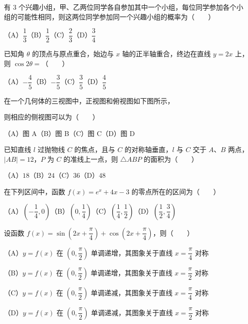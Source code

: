 \begin{question}
有 $3$ 个兴趣小组，甲、乙两位同学各自参加其中一个小组，每位同学参加各个小组的可能性相同，则这两位同学参加同一个兴趣小组的概率为\mbox{（　　）}

（A）$\dfrac13$\quad（B）$\dfrac12$\quad（C）$\dfrac23$\quad（D）$\dfrac34$

\end{question}
\begin{question}
已知角 $\theta$ 的顶点与原点重合，始边与 $x$ 轴的正半轴重合，终边在直线 $y=2x$ 上，则 $\cos2\theta=$\mbox{（　　）}

（A）$-\dfrac45$\quad（B）$-\dfrac35$\quad（C）$\dfrac35$\quad（D）$\dfrac45$

\Needspace{0.4\textheight}
\end{question}
\begin{question}
在一个几何体的三视图中，正视图和俯视图如下图所示，

则相应的侧视图可以为\mbox{（　　）}
\nopagebreak[4]
\begin{center}\end{center}
\nopagebreak[4]
（A）图 A\quad（B）图 B\quad（C）图 C\quad（D）图 D

\end{question}
\begin{question}
已知直线 $l$ 过抛物线 $C$ 的焦点，且与 $C$ 的对称轴垂直，$l$ 与 $C$ 交于 $A\text{、}B$ 两点，$|AB|=12$，$P$ 为 $C$ 的准线上一点，则 $\triangle ABP$ 的面积为\mbox{（　　）}

（A）$18$\quad（B）$24$\quad（C）$36$\quad（D）$48$

\end{question}
\begin{question}
在下列区间中，函数 $f(x)=e^x+4x-3$ 的零点所在的区间为\mbox{（　　）}

（A）$\left(-\dfrac14,0\right)$\quad（B）$\left(0,\dfrac14\right)$\quad（C）$\left(\dfrac14,\dfrac12\right)$\quad（D）$\left(\dfrac12,\dfrac34\right)$

\end{question}
\begin{question}
设函数 $f(x)=\sin\left(2x+\dfrac\pi4\right)+\cos\left(2x+\dfrac\pi4\right)$，则\mbox{（　　）}

（A）$y=f(x)$ 在 $\left(0,\dfrac\pi2\right)$ 单调递增，其图象关于直线 $x=\dfrac\pi4$ 对称

（B）$y=f(x)$ 在 $\left(0,\dfrac\pi2\right)$ 单调递增，其图象关于直线 $x=\dfrac\pi2$ 对称

（C）$y=f(x)$ 在 $\left(0,\dfrac\pi2\right)$ 单调递减，其图象关于直线 $x=\dfrac\pi4$ 对称

（D）$y=f(x)$ 在 $\left(0,\dfrac\pi2\right)$ 单调递减，其图象关于直线 $x=\dfrac\pi2$ 对称

\end{question}
